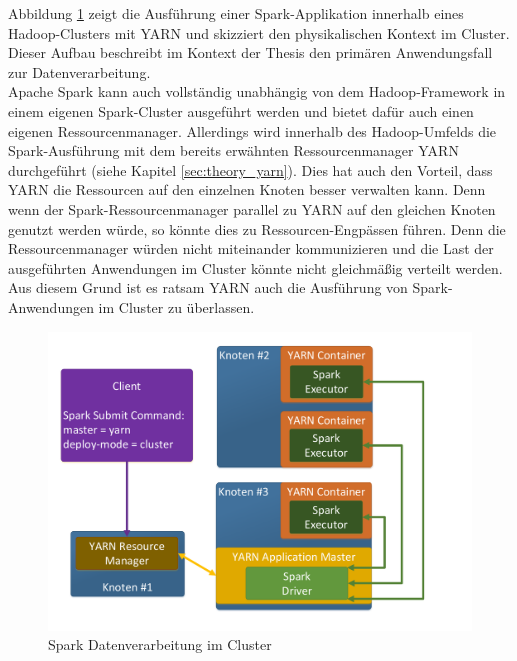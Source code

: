 \noindent
Abbildung \ref{fig:spark_cluster_architecture} zeigt die Ausführung einer Spark-Applikation innerhalb eines Hadoop-Clusters mit YARN und skizziert den physikalischen Kontext im Cluster. Dieser Aufbau beschreibt im Kontext der Thesis den primären Anwendungsfall zur Datenverarbeitung.\\ 
Apache Spark kann auch vollständig unabhängig von dem Hadoop-Framework in einem eigenen Spark-Cluster ausgeführt werden und bietet dafür auch einen eigenen Ressourcenmanager. Allerdings wird innerhalb des Hadoop-Umfelds die Spark-Ausführung mit dem bereits erwähnten Ressourcenmanager YARN durchgeführt (siehe Kapitel \ref{sec:theory_yarn}). Dies hat auch
den Vorteil, dass YARN die Ressourcen auf den einzelnen Knoten besser verwalten kann. Denn wenn der Spark-Ressourcenmanager parallel zu YARN auf den gleichen Knoten genutzt werden würde, so könnte dies zu Ressourcen-Engpässen führen. Denn die Ressourcenmanager würden nicht miteinander kommunizieren und die Last der ausgeführten Anwendungen im Cluster könnte nicht gleichmäßig verteilt werden. Aus diesem Grund ist es ratsam YARN auch die Ausführung von Spark-Anwendungen im Cluster zu überlassen.\\

\begin{figure}[ht]
  \centering
  \includegraphics[width=\textwidth]{./resource/spark_cluster_architecture.pdf}
  \caption{Spark Datenverarbeitung im Cluster}
  \label{fig:spark_cluster_architecture}
\end{figure}

